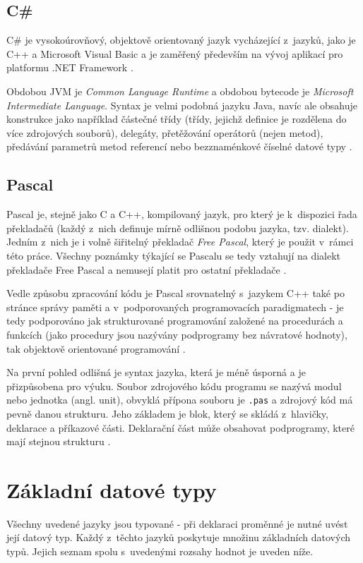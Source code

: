 \documentclass[onepage, a4paper, 12pt]{bakalarka}
\begin{document}
\subsection{C\#}
C\# je vysokoúrovňový, objektově orientovaný jazyk vycházející z~jazyků, jako je C++ a Microsoft Visual Basic a je zaměřený především na vývoj aplikací pro platformu .NET Framework \cite{cs-book, cs-guide-basic}.\par
Obdobou JVM je \textit{Common Language Runtime} a obdobou bytecode je \textit{Microsoft Intermediate Language}. Syntax je velmi podobná jazyku Java, navíc ale obsahuje konstrukce jako například částečné třídy (třídy, jejichž definice je rozdělena do více zdrojových souborů), delegáty, přetěžování operátorů (nejen metod), předávání parametrů metod referencí nebo bezznaménkové číselné datové typy \cite{cs-book, cs-guide-clr, cs-guide-msil, cs-guide-jit, cs-guide-types}.\par

\subsection{Pascal}
Pascal je, stejně jako C a C++, kompilovaný jazyk, pro který je k~dispozici řada překladačů (každý z~nich definuje mírně odlišnou podobu jazyka, tzv. dialekt). Jedním z~nich je i volně šiřitelný překladač \textit{Free Pascal}, který je použit v~rámci této práce. Všechny poznámky týkající se Pascalu se tedy vztahují na dialekt překladače Free Pascal a nemusejí platit pro ostatní překladače \cite{pas-book}.\par
Vedle způsobu zpracování kódu je Pascal srovnatelný s~jazykem C++ také po stránce správy paměti a v~podporovaných programovacích paradigmatech - je tedy podporováno jak strukturované programování založené na procedurách a funkcích (jako procedury jsou nazývány podprogramy bez návratové hodnoty), tak objektově orientované programování \cite{pas-book}.\par
Na první pohled odlišná je syntax jazyka, která je méně úsporná a je přizpůsobena pro výuku. Soubor zdrojového kódu programu se nazývá modul nebo jednotka (angl. unit), obvyklá přípona souboru je \texttt{.pas} a zdrojový kód má pevně danou strukturu. Jeho základem je blok, který se skládá z~hlavičky, deklarace a příkazové části. Deklarační část může obsahovat podprogramy, které mají stejnou strukturu \cite{pas-book, pas-guide-about}.\par

\section{Základní datové typy}
Všechny uvedené jazyky jsou typované - při deklaraci proměnné je nutné uvést její datový typ. Každý z~těchto jazyků poskytuje množinu základních datových typů. Jejich seznam spolu s~uvedenými rozsahy hodnot je uveden níže.
\end{document}
